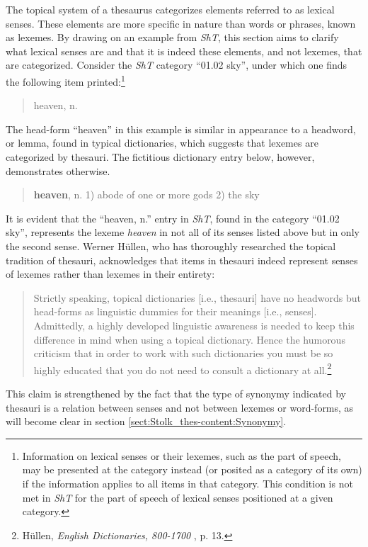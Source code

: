 The topical system of a thesaurus categorizes elements referred to as lexical senses. These elements are more specific in nature than words or phrases, known as lexemes. By drawing on an example from \textit{ShT}, this section aims to clarify what lexical senses are and that it is indeed these elements, and not lexemes, that are categorized. Consider the \textit{ShT} category ``01.02 sky'', under which one finds the following item printed:\footnote{Information on lexical senses or their lexemes, such as the part of speech, may be presented at the category instead (or posited as a category of its own) if the information applies to all items in that category. This condition is not met in \textit{ShT} for the part of speech of lexical senses positioned at a given category.}
\begin{quotation} \noindent
    heaven, n.
\end{quotation}
The head-form ``heaven'' in this example is similar in appearance to a headword, or lemma, found in typical dictionaries, which suggests that lexemes are categorized by thesauri. The fictitious dictionary entry below, however, demonstrates otherwise.
\begin{quotation} \noindent
	\textbf{heaven}, n. 1) abode of one or more gods 2) the sky
\end{quotation}
It is evident that the ``heaven, n.'' entry in \textit{ShT}, found in the category ``01.02 sky'', represents the lexeme \textit{heaven} in not all of its senses listed above but in only the second sense. Werner Hüllen, who has thoroughly researched the topical tradition of thesauri, acknowledges that items in thesauri indeed represent senses of lexemes rather than lexemes in their entirety: 
\begin{quotation} \noindent
    Strictly speaking, topical dictionaries [i.e., thesauri] have no headwords but head-forms as linguistic dummies for their meanings [i.e., senses]. Admittedly, a highly developed linguistic awareness is needed to keep this difference in mind when using a topical dictionary. Hence the humorous criticism that in order to work with such dictionaries you must be so highly educated that you do not need to consult a dictionary at all.\footnote{Hüllen, \textit{English Dictionaries, 800-1700}%
    , p. 13.}
\end{quotation}
This claim is strengthened by the fact that the type of synonymy indicated by thesauri is a relation between senses and not between lexemes or word-forms, as will become clear in section \ref{sect:Stolk_thes-content:Synonymy}.

